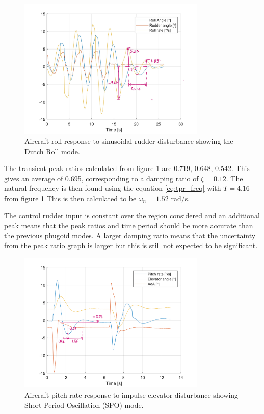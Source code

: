 \documentclass{article}
\begin{document}
\begin{figure}[H]
  \centering
  \includegraphics[width=0.8\textwidth]{figures/anDutchRoll.jpg}
  \caption{Aircraft roll response to sinusoidal rudder disturbance showing the Dutch Roll mode.}
  \label{fig:dutchroll}
\end{figure}

The transient peak ratios calculated from figure \ref{fig:dutchroll} are 0.719, 0.648, 0.542.
This gives an average of 0.695, corresponding to a damping ratio of $\zeta = 0.12$.
The natural frequency is then found using the equation \ref{eq:tpr_freq} with $T=4.16$ from figure \ref{fig:dutchroll}
This is then calculated to be $\omega_n = 1.52$ rad/s.

The control rudder input is constant over the region considered and an additional peak means that the peak ratios and time period should be more accurate than the previous phugoid modes.
A larger damping ratio means that the uncertainty from the peak ratio graph is larger but this is still not expected to be significant.

\begin{figure}[H]
  \centering
  \includegraphics[width=0.8\textwidth]{figures/anSPO.png}
  \caption{Aircraft pitch rate response to impulse elevator disturbance showing Short Period Oscillation (SPO) mode.}
  \label{fig:spo}
\end{figure}
\end{document}
